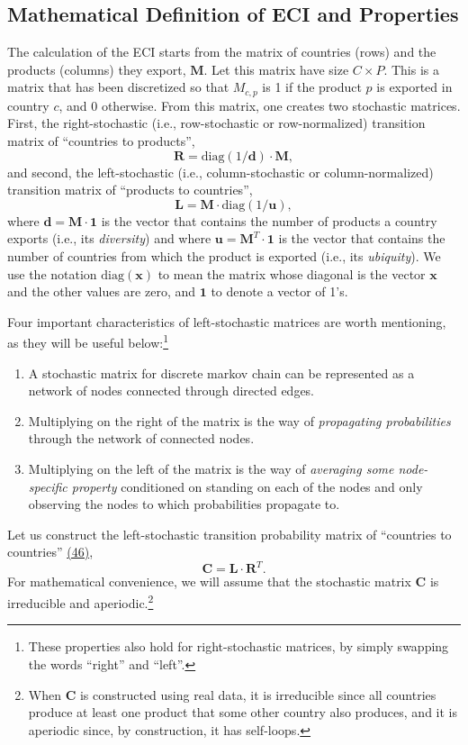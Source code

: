 \documentclass{pnastwo}
\newcommand{\mtx}[1]{\mathbf{ #1}}
\newcommand{\diag}[1]{\mathrm{diag}\left( #1\right)}
\renewcommand{\vec}[1]{\mathbf{#1}}
\begin{document}
\begin{article}
\section{Mathematical Definition of ECI and Properties}
\label{sec:ECIdefinition}
The calculation of the ECI starts from the matrix of countries (rows) and the products (columns) they export, $\mtx{M}$. Let this matrix have size $C\times P$. This is a matrix that has been discretized so that $M_{c,p}$ is 1 if the product $p$ is exported in country $c$, and 0 otherwise. From this matrix, one creates two stochastic matrices. First, the right-stochastic (i.e., row-stochastic or row-normalized) transition matrix of ``countries to products'', $$\mtx{R}=\diag{1/\vec{d}}\cdot\mtx{M},$$ and second, the left-stochastic (i.e., column-stochastic or column-normalized) transition matrix of ``products to countries'', $$\mtx{L}=\mtx{M}\cdot\diag{1/\vec{u}},$$ where $\vec{d}=\mtx{M}\cdot\vec{1}$ is the vector that contains the number of products a country exports (i.e., its \emph{diversity}) and where $\vec{u}=\mtx{M}^T\cdot\vec{1}$ is the vector that contains the number of countries from which the product is exported (i.e., its \emph{ubiquity}). We use the notation $\diag{\vec{x}}$ to mean the matrix whose diagonal is the vector $\vec{x}$ and the other values are zero, and $\vec{1}$ to denote a vector of 1's.

Four important characteristics of left-stochastic matrices are worth mentioning, as they will be useful below:\footnote{These properties also hold for right-stochastic matrices, by simply swapping the words ``right'' and ``left''.} 
\begin{enumerate}
    \item A stochastic matrix for discrete markov chain can be represented as a network of nodes connected through directed edges. 
    \item Multiplying on the right of the matrix is the way of \emph{propagating probabilities} through the network of connected nodes. 
    \item Multiplying on the left of the matrix is the way of \emph{averaging some node-specific property} conditioned on standing on each of the nodes and only observing the nodes to which probabilities propagate to.
\end{enumerate}


Let us construct the left-stochastic transition probability matrix of ``countries to countries'' \hyperref[csl:46]{(46)}, $$\mtx{C}=\mtx{L}\cdot\mtx{R}^T.$$ For mathematical convenience, we will assume that the stochastic matrix $\mtx{C}$ is irreducible and aperiodic.\footnote{When $\mtx{C}$ is constructed using real data, it is irreducible since all countries produce at least one product that some other country also produces, and it is aperiodic since, by construction, it has self-loops.} 


\end{article}
\end{document}
